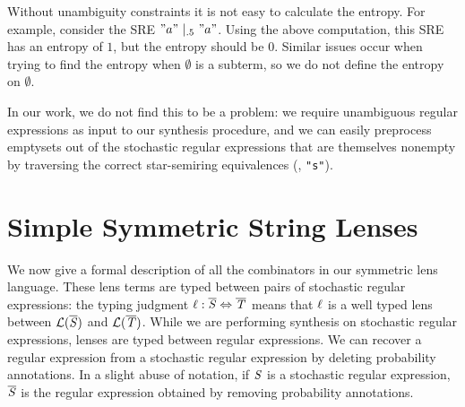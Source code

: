 \documentclass[acmsmall,screen,anonymous]{acmart}
\begin{document}
Without unambiguity constraints it is not easy to calculate the entropy. For
example, consider the SRE $\PRegexOr{\lstinline{"a"}}{\lstinline{"a"}}{.5}$.
Using the above computation, this SRE has an entropy of $1$, but the entropy
should be $0$. Similar issues occur when trying to find the entropy when
$\emptyset$ is a subterm, so we do not define the entropy on $\emptyset$.

In our work, we do not find this to be a problem: we require
unambiguous regular 
expressions as input to our synthesis procedure, and we can easily preprocess
emptysets out of the stochastic regular expressions that are themselves nonempty
by traversing the correct star-semiring equivalences
(\EG,  \SSREquiv \lstinline{"s"}).


\section{Simple Symmetric String Lenses}
\label{sec:ssl}
We now give a formal description of all the combinators in our symmetric lens
language. These lens terms are typed between pairs of stochastic regular
expressions: the typing judgment $\mathit{\ell} : \overline{\mathit{S}} \Leftrightarrow
\overline{\mathit{T}}$ means that $\mathit{\ell}$ is a well typed lens between
$\mathcal{L}(\overline{\mathit{S}})$ and $\mathcal{L}(\overline{\mathit{T}})$. While we are performing
synthesis on stochastic regular expressions, lenses are typed between regular
expressions.  We can recover a regular expression from a stochastic regular
expression by deleting probability annotations.  In a slight abuse of notation,
if $\mathit{S}$ is a stochastic regular expression, $\overline{\mathit{S}}$ is the regular
expression obtained by removing probability annotations.
\end{document}
